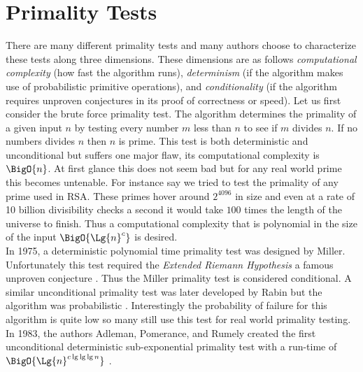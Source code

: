 \documentclass[./Thesis.tex]{subfiles}
\begin{document}
\section{Primality Tests}
There are many different primality tests and many authors choose to characterize
these tests along three dimensions. These dimensions are as follows
\textit{computational complexity} (how fast the algorithm runs),
\textit{determinism} (if the algorithm makes use of probabilistic primitive
operations), and \textit{conditionality} (if the algorithm requires unproven
conjectures in its proof of correctness or speed). Let us first consider the
brute force primality test. The algorithm determines the primality of a given
input $n$ by testing every number $m$ less than $n$ to see if $m$ divides $n$.
If no numbers divides $n$ then $n$ is prime. This test is both deterministic and
unconditional but suffers one major flaw, its computational complexity is
$\BigO{n}$. At first glance this does not seem bad but for any real world prime
this becomes untenable. For instance say we tried to test the primality of any
prime used in RSA. These primes hover around $2^{4096}$ in size and even at a
rate of 10 billion divisibility checks a second it would take $100$ times the
length of the universe to finish. Thus a computational complexity that is
polynomial in the size of the input $\BigO{\Lg{n}^c}$ is desired. \\

In 1975, a deterministic polynomial time primality test was designed by Miller.
Unfortunately this test required the
\textit{Extended Riemann Hypothesis} a famous unproven conjecture \cite{miller}.
Thus the Miller primality test is considered conditional. A similar
unconditional primality test was later developed by Rabin but the algorithm was
probabilistic \cite{rabin}. Interestingly the probability of failure for this
algorithm is quite low so many still use this test for real world primality
testing. In 1983, the authors Adleman, Pomerance, and Rumely created the first
unconditional deterministic sub-exponential primality test with a run-time of
$\BigO{\Lg{n}^{c \, \text{lg} \, \text{lg} \, \text{lg} \, n}}$ \cite{apr}. \\
\end{document}

